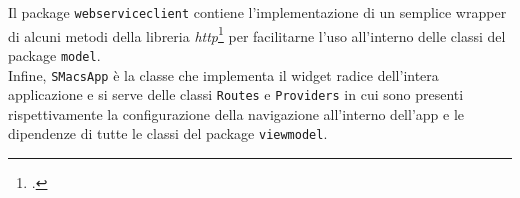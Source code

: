 Il package \texttt{webserviceclient} contiene l'implementazione di un semplice wrapper di alcuni metodi della libreria \emph{http}\footcite{site:http-library} per facilitarne l'uso all'interno delle classi del package \texttt{model}.\\
Infine, \texttt{SMacsApp} è la classe che implementa il widget radice dell'intera applicazione e si serve delle classi \texttt{Routes} e \texttt{Providers} in cui sono presenti rispettivamente la configurazione della navigazione all'interno dell'app e le dipendenze di tutte le classi del package \texttt{viewmodel}.

